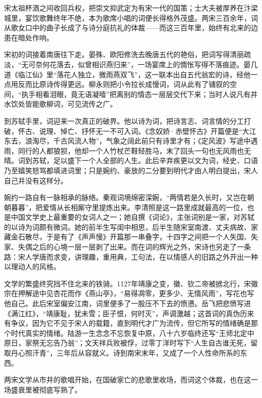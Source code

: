 
\begin{intro}
宋太祖杯酒之间收回兵权，把崇文抑武定为有宋一代的国策；士大夫被厚养在汴梁城里，宴饮歌舞终年不绝，本为歌席小唱的词便长得格外茂盛。两宋三百余年，词从歌女口中的曲子长成了与诗分庭抗礼的体裁——而这三百年里，始终有北来的边患在暗处作响。

宋初的词接着南唐往下走。晏殊、欧阳修洗去晚唐五代的艳俗，把词写得清丽疏淡，“无可奈何花落去，似曾相识燕归来”，一场宴席上的惆怅写得不落痕迹。晏几道《临江仙》里“落花人独立，微雨燕双飞”，这一联本出自五代翁宏的诗，经他一点用反而比原诗传得更远。柳永则把小令拉长成慢词，词从此有了铺叙的空间，“执手相看泪眼，竟无语凝噎”把离别的情态一层层交代下来；当时人说凡有井水饮处皆能歌柳词，可见流传之广。

到苏轼手里，词迎来一次真正的破界。他以诗为词，把诗言志、词言情的分工打破，怀古、说理、悼亡、抒怀无一不可入词。《念奴娇·赤壁怀古》开篇便是“大江东去，浪淘尽，千古风流人物”，气象之阔此前只有诗里才有；《定风波》写途中遇雨，同行的人都狼狈，他却一个人竹杖芒鞋轻胜马，末了回头一句也无风雨也无晴。词到苏轼，足以盛下一个人全部的人生。此后辛弃疾更以文为词，经史、口语乃至嬉笑怒骂都填进词里；只是婉约、豪放的二分要到明代才由人明白提出，宋人自己并没有这样分。

婉约一路自有一脉相承的脉络。秦观词境绵密深婉，“两情若是久长时，又岂在朝朝暮暮”，把爱情从长相厮守里提炼出来。李清照是这一路里成就最高的一位，也是中国文学史上最重要的女词人之一；她自撰《词论》，主张词别是一家，对苏轼的以诗为词颇有微词。她的前半生写闺中相思，后半生随宋室南渡、丈夫病故、家藏金石散尽，于是有了《声声慢》开篇那一串叠字，十四字之间把一个人失国、失家、失偶之后的心境一层一层剥了出来。而在词的辉光之外，宋诗也另走了一条路：宋人学唐而求变，讲理趣，重用典，工句法，在以情感人的旧路之外开出一种以理动人的风格。

文学的繁盛终究挡不住北来的铁骑。1127年靖康之变，徽、钦二帝被掳北行，宋徽宗在押解途中见杏花而作《燕山亭》，“易得凋零，更多少、无情风雨”，写花也写他自己。此后宋室偏安江南，词里便多了一股压不下去的愤懑。岳飞把悲愤写进《满江红》，“靖康耻，犹未雪；臣子恨，何时灭”，声调激越；这首词的真伪历来有争议，因为它不见于宋人的载籍，直到明代才广为流传，但它所写的情绪确是那个时代真实的情绪。陆游一生念念不忘恢复中原，八十六岁临终还写“王师北定中原日，家祭无忘告乃翁”；文天祥兵败被俘，过零丁洋时写下“人生自古谁无死，留取丹心照汗青”，三年后从容就义。诗到南宋末年，又成了一个人性命所系的东西。

两宋文学从市井的歌唱开始，在国破家亡的悲歌里收场，而词这个体裁，也在这一场盛衰里被彻底写熟了。
\end{intro}
